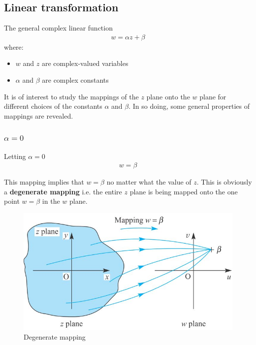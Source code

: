 \documentclass[10pt,a4paper]{article}
\begin{document}
\pagebreak

\subsection{Linear transformation}

The general complex linear function
\begin{align*}
    w = \alpha z + \beta
\end{align*}
where:
\begin{itemize}
    \item $w$ and $z$ are complex-valued variables
    \item $\alpha$ and $\beta$ are complex constants
\end{itemize}  

It is of interest to study the mappings of the $z$ plane onto the $w$ plane for different choices of
the constants $\alpha$ and $\beta$. In so doing, some general properties of mappings are revealed.

\subsubsection{$\alpha = 0$}

Letting $\alpha = 0$
\begin{align*}
    w = \beta
\end{align*}

This mapping implies that $w = \beta$ no matter what the value of $z$. This is obviously a
\textbf{degenerate mapping} i.e. the entire $z$ plane is being mapped onto the one point $w = \beta$
in the $w$ plane.
\begin{figure} [h!]
    \centering
    \includegraphics[scale=0.3]{Degenerate mapping.JPG}
    \caption{Degenerate mapping}
\end{figure}
\end{document}
